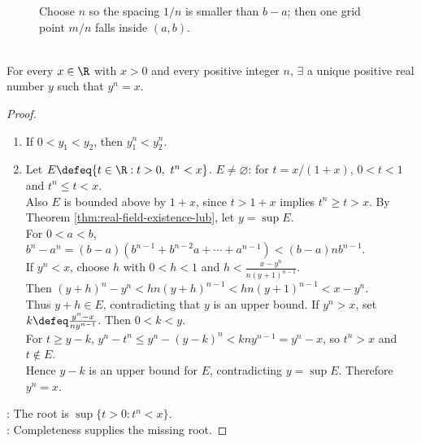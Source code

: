 \begin{figure}[H]
  \centering
  
  \caption{Choose $n$ so the spacing $1/n$ is smaller than $b-a$; then one grid point $m/n$ falls inside $(a,b)$.}
  \label{fig:rational-density-step-size}
\end{figure}

\begin{theorem} \label{thm:nth-roots-positive-reals} \\
For every $x\in\R$ with $x>0$ and every positive integer $n$, $\exists$ a unique positive real number $y$ such that $y^n=x$.
\begin{proof}
\begin{enumerate}[label=(\roman*)]
\setlength{\itemsep}{0pt}
\item {} If $0<y_1<y_2$, then $y_1^n<y_2^n$.
\item {} Let $E\defeq\{t\in\R:t>0,\ t^n<x\}$. $E\neq\varnothing$: for $t=x/(1+x)$, $0<t<1$ and $t^n\leq t<x$.\\
Also $E$ is bounded above by $1+x$, since $t>1+x$ implies $t^n\geq t>x$. By Theorem \ref{thm:real-field-existence-lub}, let $y=\sup E$.\\
For $0<a<b$, $b^n-a^n=(b-a)(b^{n-1}+b^{n-2}a+\cdots+a^{n-1})<(b-a)nb^{n-1}$.\\
If $y^n<x$, choose $h$ with $0<h<1$ and $h<\frac{x-y^n}{n(y+1)^{n-1}}$.\\
Then $(y+h)^n-y^n<hn(y+h)^{n-1}<hn(y+1)^{n-1}<x-y^n$.\\
Thus $y+h\in E$, contradicting that $y$ is an upper bound. If $y^n>x$, set $k\defeq\frac{y^n-x}{ny^{n-1}}$. Then $0<k<y$.\\
For $t\geq y-k$, $y^n-t^n\leq y^n-(y-k)^n<kny^{n-1}=y^n-x$, so $t^n>x$ and $t\notin E$.\\
Hence $y-k$ is an upper bound for $E$, contradicting $y=\sup E$. Therefore $y^n=x$.
\end{enumerate}
: The root is $\sup\{t>0:t^n<x\}$.\\
: Completeness supplies the missing root.
\end{proof}
\end{theorem}

